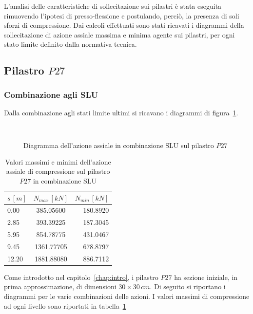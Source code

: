 L'analisi delle caratteristiche di sollecitazione sui pilastri è stata eseguita rimuovendo l'ipotesi di presso-flessione e postulando, perciò, la presenza di soli sforzi di compressione. Dai calcoli effettuati sono stati ricavati i diagrammi della sollecitazione di azione assiale massima e minima agente sui pilastri, per ogni stato limite definito dalla normativa tecnica.

\subsection{Pilastro $P27$}

\subsubsection{Combinazione agli SLU}

Dalla combinazione agli stati limite ultimi si ricavano i diagrammi di figura~\ref{fig:P27_axialLoad_slu}.

\begin{figure}
    \centering
	\\
	\caption{Diagramma dell'azione assiale in combinazione SLU sul pilastro $P27$}
	\label{fig:P27_axialLoad_slu}
\end{figure}

\begin{table}
    \centering
	\caption{Valori massimi e minimi dell'azione assiale di compressione sul pilastro $P27$ in combinazione SLU}
	\label{tab:P27_axialLoad_slu}
	\begin{tabular*}{\textwidth}{l @{\extracolsep{\fill}} cr}
		\toprule
		$s\,[m]$ & $N_{max}\,[kN]$ & $N_{min}\,[kN]$ \\
		\midrule
		0.00 &   385.05600 &   180.8920 \\
		2.85 &   393.39225 &   187.3045 \\
		5.95 &   854.78775 &   431.0467 \\
		9.45 &  1361.77705 &   678.8797 \\
		12.20 &  1881.88080 &   886.7112 \\
		\bottomrule
	\end{tabular*}
\end{table}

Come introdotto nel capitolo~\ref{chap:intro}, i pilastro $P27$ ha sezione iniziale, in prima approssimazione, di dimensioni $30\times30\,cm$. Di seguito si riportano i diagrammi per le varie combinazioni delle azioni.
\noindent
I valori massimi di compressione ad ogni livello sono riportati in tabella~\ref{tab:P27_axialLoad_slu}


